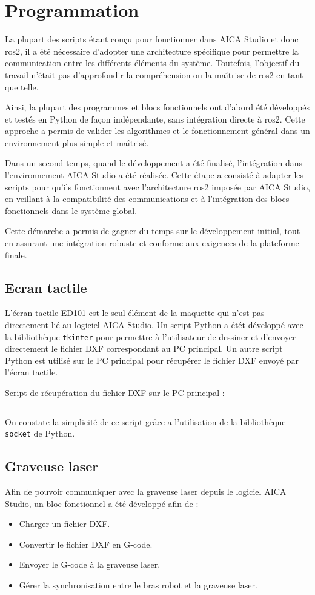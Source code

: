 \chapter{Programmation}
\label{chap:programmation}

La plupart des scripts étant conçu pour fonctionner dans AICA Studio et donc \gls{ros2}, il a été nécessaire d'adopter une architecture spécifique pour permettre la communication entre les différents éléments du système. Toutefois, l'objectif du travail n'était pas d'approfondir la compréhension ou la maîtrise de \gls{ros2} en tant que telle.

Ainsi, la plupart des programmes et blocs fonctionnels ont d'abord été développés et testés en Python de façon indépendante, sans intégration directe à \gls{ros2}. Cette approche a permis de valider les algorithmes et le fonctionnement général dans un environnement plus simple et maîtrisé.

Dans un second temps, quand le développement a été finalisé, l'intégration dans l'environnement AICA Studio a été réalisée. Cette étape a consisté à adapter les scripts pour qu'ils fonctionnent avec l'architecture \gls{ros2} imposée par AICA Studio, en veillant à la compatibilité des communications et à l'intégration des blocs fonctionnels dans le système global.

Cette démarche a permis de gagner du temps sur le développement initial, tout en assurant une intégration robuste et conforme aux exigences de la plateforme finale.

\section{Ecran tactile}
L'écran tactile ED101 est le seul élément de la maquette qui n'est pas directement lié au logiciel AICA Studio. Un script Python a étét développé avec la bibliothèque \texttt{tkinter} pour permettre à l'utilisateur de dessiner et d'envoyer directement le fichier DXF correspondant au PC principal. Un autre script Python est utilisé sur le PC principal pour récupérer le fichier DXF envoyé par l'écran tactile.

Script de récupération du fichier DXF sur le PC principal :

\inputminted{python}{assets/code/tcp_ecoute.py}

On constate la simplicité de ce script grâce a l'utilisation de la bibliothèque \texttt{socket} de Python.

\section{Graveuse laser}
Afin de pouvoir communiquer avec la graveuse laser depuis le logiciel AICA Studio, un bloc fonctionnel a été développé afin de :
\begin{itemize}
    \item Charger un fichier DXF.
    \item Convertir le fichier DXF en G-code.
    \item Envoyer le G-code à la graveuse laser.
    \item Gérer la synchronisation entre le bras robot et la graveuse laser.
\end{itemize}

